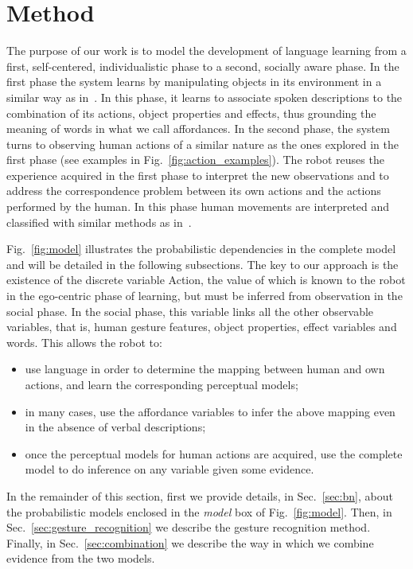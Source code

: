 \section{Method}
\label{sec:approach}

The purpose of
our work
is to model the development of language learning from a first, self-centered, individualistic phase to a second, socially aware phase.
In the first phase the system learns by manipulating objects in its environment in a similar way as in~\cite{salvi:2012:smcb}.
In this phase, it learns to associate spoken descriptions to the combination of its actions, object properties and effects, thus grounding the meaning of words in what we call affordances.
In the second phase, the system turns to observing human actions of a similar nature as the ones explored in the first phase (see examples in Fig.~\ref{fig:action_examples}).
The robot reuses the experience acquired in the first phase to interpret the new observations and to address the correspondence problem between its own actions and the actions performed by the human.
In this phase human movements are interpreted and classified with similar methods as in~\cite{saponaro:2013:crhri}.

Fig.~\ref{fig:model} illustrates the probabilistic dependencies in the complete model and will be detailed in the following subsections.
The key to our approach is the existence of the discrete variable Action, the value of which is known to the robot in the ego-centric phase of learning, but must be inferred from observation in the social phase.
In the social phase, this variable links all the other observable variables, that is, human gesture features, object properties, effect variables and words.
This allows the robot to:
\begin{itemize}
\item use language in order to determine the mapping between human and own actions, and learn the corresponding perceptual models;

\item in many cases, use the affordance variables to infer the above mapping even in the absence of verbal descriptions;

\item once the perceptual models for human actions are acquired, use the complete model to do inference on any variable given some evidence.
\end{itemize}
In the remainder of this section, first we provide details, in Sec.~\ref{sec:bn}, about the probabilistic models enclosed in the \emph{\AffWords{} model} box of Fig.~\ref{fig:model}.
Then, in Sec.~\ref{sec:gesture_recognition} we describe the gesture recognition method.
Finally, in Sec.~\ref{sec:combination} we describe the way in which we combine evidence from the two models. %

